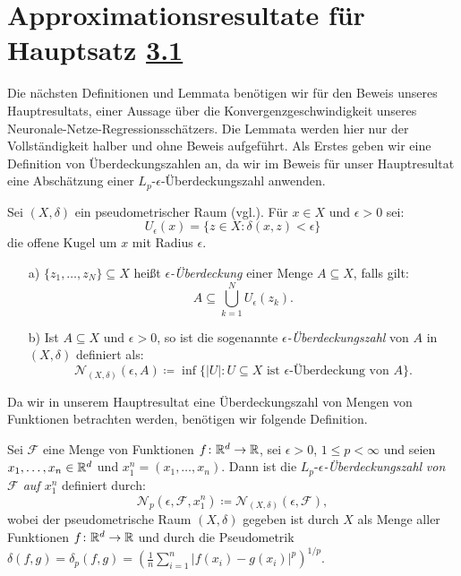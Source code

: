 \section{Approximationsresultate für Hauptsatz \hyperref[optstop]{3.1}}
Die nächsten  Definitionen und Lemmata benötigen wir für den Beweis unseres Hauptresultats, einer Aussage über die Konvergenzgeschwindigkeit unseres Neuronale-Netze-Regressionsschätzers. Die Lemmata werden hier nur der Vollständigkeit halber und ohne Beweis aufgeführt. 
Als Erstes geben wir eine Definition von Überdeckungszahlen an, da wir im Beweis für unser Hauptresultat eine Abschätzung einer $L_p\text{-}\epsilon$-Überdeckungszahl anwenden.
\begin{defn}
\label{ueberdeckung}
Sei $(X, \delta)$ ein pseudometrischer Raum (vgl.\@ \cite[Definition~2.1.1]{Topologie2015}). Für $x \in X$ und $\epsilon > 0$ sei:
$$U_{\epsilon}(x) = \{z \in X : \delta(x, z) < \epsilon\}$$
die offene Kugel um $x$ mit Radius $\epsilon$.
\begin{itemize}
\item[a)] $\{z_1,\dots,z_N\} \subseteq X$ heißt $\epsilon$\textit{-Überdeckung} einer Menge $A \subseteq X$, falls gilt:
$$A \subseteq \bigcup_{k = 1}^N U_{\epsilon}(z_k).$$
\item[b)] Ist $A \subseteq X$ und $\epsilon > 0$, so ist die sogenannte $\epsilon$\textit{-Überdeckungszahl} von $A$ in $(X,\delta)$ definiert als:
$$\mathcal{N}_{(X,\delta)}(\epsilon, A) \coloneqq \inf\big\{|U| : U \subseteq X \text{ ist $\epsilon$-Überdeckung von } A\big\}.$$   
\end{itemize}
\end{defn}
Da wir in unserem Hauptresultat eine Überdeckungszahl von Mengen von Funktionen betrachten werden, benötigen wir folgende Definition.
\begin{defn}
\label{lpe}
Sei $\mathcal{F}$ eine Menge von Funktionen $f\colon \mathbb{R}^d \to \mathbb{R}$, sei $\epsilon > 0$, $1 \leq p < \infty$ und seien $x_1,\dots,x_n \in \mathbb{R}^d$ und $x_1^n = (x_1,\dots,x_n).$ Dann ist die $L_p$-$\epsilon$\textit{-Überdeckungszahl} \emph{von $\mathcal{F}$ auf $x_1^n$} definiert durch:
$$\mathcal{N}_p(\epsilon, \mathcal{F}, x_1^n) \coloneqq \mathcal{N}_{(X,\delta)}(\epsilon, \mathcal{F}),$$
wobei der pseudometrische Raum $(X, \delta)$ gegeben ist durch $X$ als Menge aller Funktionen $f\colon \mathbb{R}^d \to \mathbb{R}$ und durch die Pseudometrik $\delta(f, g) = \delta_p(f, g) = (\frac{1}{n}\sum_{i = 1}^n |f(x_i) - g(x_i)|^p)^{1/p}.$
\end{defn}
